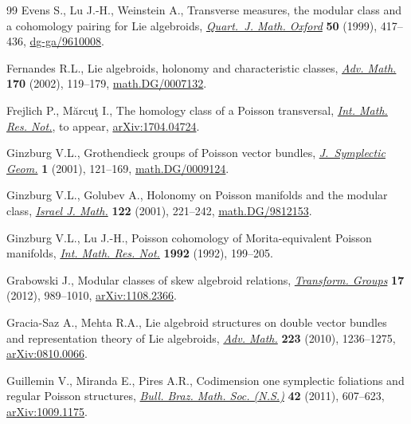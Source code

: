 \documentclass[11pt]{article}
\numberwithin{equation}{section}
\newcommand{\8}{\infty}
\begin{document}
\begin{thebibliography}{99}
Evens S., Lu J.-H., Weinstein A., Transverse measures, the modular class and a
 cohomology pairing for {L}ie algebroids, \href{https://doi.org/10.1093/qjmath/50.200.417}{\textit{Quart.~J. Math. Oxford}}
 \textbf{50} (1999), 417--436, \href{https://arxiv.org/abs/dg-ga/9610008}{dg-ga/9610008}.

Fernandes R.L., Lie algebroids, holonomy and characteristic classes,
 \href{https://doi.org/10.1006/aima.2001.2070}{\textit{Adv. Math.}} \textbf{170} (2002), 119--179, \href{https://arxiv.org/abs/math.DG/0007132}{math.DG/0007132}.

Frejlich P., M\u{a}rcu\c{t} I., The homology class of a {P}oisson transversal,
 \href{https://doi.org/10.1093/imrn/rny105}{\textit{Int. Math. Res. Not.}}, {t}o appear, \href{https://arxiv.org/abs/1704.04724}{arXiv:1704.04724}.

Ginzburg V.L., Grothendieck groups of {P}oisson vector bundles,
 \href{https://doi.org/10.4310/JSG.2001.v1.n1.a4}{\textit{J.~Symplectic Geom.}} \textbf{1} (2001), 121--169,
 \href{https://arxiv.org/abs/math.DG/0009124}{math.DG/0009124}.

Ginzburg V.L., Golubev A., Holonomy on {P}oisson manifolds and the modular
 class, \href{https://doi.org/10.1007/BF02809901}{\textit{Israel J. Math.}} \textbf{122} (2001), 221--242,
 \href{https://arxiv.org/abs/math.DG/9812153}{math.DG/9812153}.

Ginzburg V.L., Lu J.-H., Poisson cohomology of {M}orita-equivalent {P}oisson
 manifolds, \href{https://doi.org/10.1155/S1073792892000229}{\textit{Int. Math. Res. Not.}} \textbf{1992} (1992), 199--205.

Grabowski J., Modular classes of skew algebroid relations, \href{https://doi.org/10.1007/s00031-012-9197-2}{\textit{Transform.
 Groups}} \textbf{17} (2012), 989--1010, \href{https://arxiv.org/abs/1108.2366}{arXiv:1108.2366}.

Gracia-Saz A., Mehta R.A., Lie algebroid structures on double vector bundles
 and representation theory of {L}ie algebroids, \href{https://doi.org/10.1016/j.aim.2009.09.010}{\textit{Adv. Math.}}
 \textbf{223} (2010), 1236--1275, \href{https://arxiv.org/abs/0810.0066}{arXiv:0810.0066}.

Guillemin V., Miranda E., Pires A.R., Codimension one symplectic foliations and
 regular {P}oisson structures, \href{https://doi.org/10.1007/s00574-011-0031-6}{\textit{Bull. Braz. Math. Soc. (N.S.)}}
 \textbf{42} (2011), 607--623, \href{https://arxiv.org/abs/1009.1175}{arXiv:1009.1175}.


\end{thebibliography}
\end{document}
